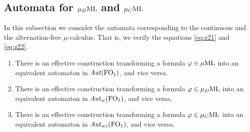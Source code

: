 \subsection{Automata for $\mu_{D}\mathrm{ML}$ and $\mu_{C}\mathrm{ML}$}

In this subsection we consider the automata corresponding to the 
continuous and the alternation-free $\mu$-calculus. 
That is, we verify the equations \eqref{eq:z21} and \eqref{eq:z22}.

\begin{theorem}
\label{t:mlaut}
\begin{enumerate}
\item 
There is an effective construction transforming a formula $\varphi \in \mu\mathrm{ML}$ into
an equivalent automaton in $\mathit{Aut}(\mathrm{FO}_1)$, and vice versa.
\item 
There is an effective construction transforming a formula $\varphi \in \mu_{D}\mathrm{ML}$ into
an equivalent automaton in $\mathit{Aut}_{w}(\mathrm{FO}_1)$, and vice versa.
\item 
There is an effective construction transforming a formula $\varphi \in \mu_{C}\mathrm{ML}$ into
an equivalent automaton in $\mathit{Aut}_{wc}(\mathrm{FO}_1)$, and vice versa.
\end{enumerate}
\end{theorem}

